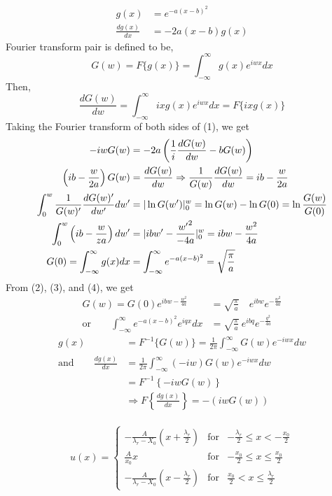 \documentclass[letterpage]{article}
\begin{document}
\begin{align}
  g(x)& =e^{-a(x-b)^2}\\
  \frac{dg(x)}{dx}& = -2a(x-b)g(x)
\end{align}
Fourier transform pair is defined to be,
\begin{equation}
  G(w) = F\{g(x)\} = \int_{-\infty}^\infty g(x)e^{iwx}dx
\end{equation}
Then,
\begin{equation}
  \frac{dG(w)}{dw} = \int_{-\infty}^\infty ixg(x)e^{iwx}dx = F\{ixg(x)\}
\end{equation}
Taking the Fourier transform of both sides of (1), we get
\begin{align}
  -iwG(w) &= -2a \left(\frac{1}{i} \frac{dG(w)}{dw} - bG(w)\right)\\
  \left(ib-\frac{w}{2a}\right) G(w) &= \frac{dG(w)}{dw} \Rightarrow
    \frac{1}{G(w)} \frac{dG(w)}{dw} = ib-\frac{w}{2a}\\
  \int_0^w \frac{1}{G(w)'} \frac{dG(w)'}{dw'} dw' &= 
    \arrowvert\ln G(w')\arrowvert_0^w = \ln G(w) - \ln G(0) 
    = \ln \frac{G(w)}{G(0)}\\
  \int_0^w \left(ib-\frac{w}{za}\right)dw' 
    &= \arrowvert ibw' - \frac{{w'}^2}{-4a}
    \arrowvert_0^w = ibw-\frac{w^2}{4a}\\
  G(0) = \int_{-\infty}^\infty g(x) dx &= \int_{-\infty}^\infty e^{-a(x-b)^2}
    = \sqrt{\frac{\pi}{a}}
\end{align}
From (2), (3), and (4), we get
\begin{align}
  G(w) = G(0) e^{ibw-\frac{w^2}{4a}} &= \sqrt{\frac{\pi}{a}} \quad e^{ibw} 
    e^{-\frac{w^2}{4a}}\\
  \text{or} \qquad
  \int_{-\infty}^\infty e^{-a(x-b)^2} e^{iqx}dx &= \sqrt{\frac{\pi}{a}}
    \: e^{ibq} e^{-\frac{q^2}{4a}}
\end{align}
\begin{align}
  g(x) &=F^{-1} \{G(w)\} = \frac{1}{2\pi} \int_{-\infty}^\infty 
    G(w)e^{-iwx}dw\\
  \text{and} \qquad \frac{dg(x)}{dx} &= \frac{1}{2\pi} \int_{-\infty}^\infty
    (-iw)G(w)e^{-iwx}dw\\
  &=F^{-1} \left\{-iwG(w)\right\}\\
  &\Rightarrow F\left\{\frac{dg(x)}{dx} \right\} = -(iwG(w))
\end{align}
\\
\begin{equation*}
  u(x) = \left\{
    \begin{array}{ccc}
    -\frac{A}{\lambda_r-X_0}\left(x+\frac{\lambda_r}{2}\right) 
      & \text{for} 
      & -\frac{\lambda_r}{2} \leq x < -\frac{x_0}{2} \\
    \frac{A}{x_0}x 
      & \text{for} 
      & -\frac{x_0}{2} \leq x \leq \frac{x_0}{2} \\
    -\frac{A}{\lambda_r-X_0} \left(x-\frac{\lambda_r}{2}\right)
      & \text{for} 
      & \frac{x_0}{2} < x \leq \frac{\lambda_r}{2}
    \end{array} \right.
\end{equation*}
\end{document}
